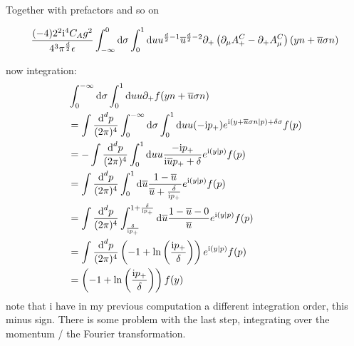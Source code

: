Together with prefactors and so on

\begin{align}
	\frac{ (-4)2^2\text{i}^4 C_A g^2 }{4^3\pi^{\frac{d}{2}}\epsilon} \int_{-\infty}^{0}\text{d} \sigma\int_0^1 \text{d} u u^{\frac{d}{2}-1}\overline u ^{\frac{d}{2}-2} \partial_+\left( \partial_\mu A^C_+ - \partial_+ A^C_\mu \right)(yn+\overline u \sigma n)
\end{align}

now integration: 
\begin{align}
	&
	\int_{0}^{-\infty} \text{d} \sigma \int_0^1 \text{d} u u \partial_+ f(yn+\overline u \sigma n)
	\\
	&=
	\int \frac{\text{d} ^d p}{(2\pi)^4}\int_{0}^{-\infty} \text{d} \sigma \int_0^1 \text{d} u u (-\text{i}p_{+}) e^{\text{i} (y+\overline u \sigma n|p)+\delta \sigma} f(p)
	\\
	&=
	-\int \frac{\text{d} ^d p}{(2\pi)^4} \int_0^1 \text{d} u u \frac{-\text{i}p_{+}}{\text{i} \overline u p_{+} + \delta} e^{\text{i} (y|p)} f(p)
	\\
	&=
	\int \frac{\text{d} ^d p}{(2\pi)^4}\int_0^1 \text{d} \overline u \frac{1-\overline u}{ \overline u + \frac{\delta}{\text{i}p_{+}}} e^{\text{i} (y|p)} f(p)
	\\
	&=
	\int \frac{\text{d} ^d p}{(2\pi)^4}\int_{\frac{\delta}{\text{i}p_{+}}}^{1+\frac{\delta}{\text{i}p_{+}}} \text{d} \overline u \frac{1-\overline u-0}{ \overline u } e^{\text{i} (y|p)} f(p)
	\\
	&=
	\int \frac{\text{d} ^d p}{(2\pi)^4}\left(-1+\ln\left(\frac{\text{i}p_{+}}{\delta}\right)\right) e^{\text{i} (y|p)} f(p)
	\\
	&=
	\left(-1+\ln\left(\frac{\text{i}p_{+}}{\delta}\right)\right) f(y)
\end{align}
note that i have in my previous computation a different integration order, this minus sign. 
There is some problem with the last step, integrating over the momentum / the Fourier transformation.
\ifdefined\mainprogram{}
\else

\fi
